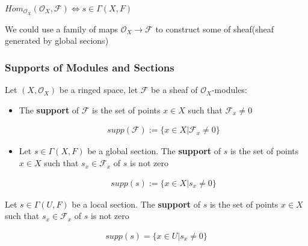 \documentclass[Total.tex]{subfiles}
\begin{document}
			\begin{center}
				$Hom_{\mathcal{O}_X}(\mathcal{O}_X,\mathcal{F})\Leftrightarrow s\in \Gamma(X,F)$ 
			\end{center}
			We could use a family of maps $\mathcal{O}_X\rightarrow \mathcal{F}$ to construct some of sheaf(sheaf generated by global secions)
			
		\subsubsection{Supports of Modules and Sections}
			
			\begin{Def}
				Let $(X,\mathcal{O}_X)$ be a ringed space, let $\mathcal{F}$ be a sheaf of $\mathcal{O}_X$-modules:
				
				\begin{itemize}
					\item The \textbf{support} of $\mathcal{F}$ is the set of points $x\in X$ such that $\mathcal{F}_x\not=0$
					
					\begin{gather*}
						supp(\mathcal{F}):=\{x\in X|\mathcal{F}_x\not=0\}
					\end{gather*}
					\item Let $s\in \Gamma(X,F)$ be a global section. The \textbf{support} of $s$ is the set of points $x\in X$ such that $s_x\in \mathcal{F}_x$ of $s$ is not zero
					
					\begin{gather*}
						supp(s):=\{x\in X|s_x\not=0\}
					\end{gather*}
				\end{itemize}
				
				\item Let $s\in \Gamma(U,F)$ be a local section. The \textbf{support} of $s$ is the set of points $x\in X$ such that $s_x\in \mathcal{F}_x$ of $s$ is not zero
				
				\begin{gather*}
					supp(s)=\{x\in U|s_x\not=0\}
				\end{gather*}
			\end{Def}
			
\end{document}

